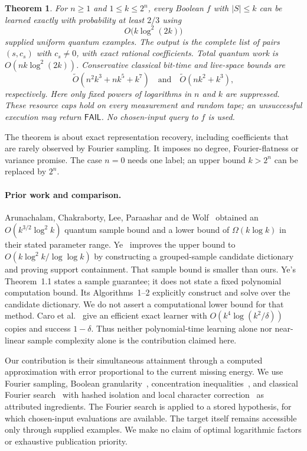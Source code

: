 \documentclass[11pt]{article}
\newtheorem{theorem}{Theorem}
\theoremstyle{remark}\newtheorem{remark}[theorem]{Remark}
\newcommand{\FAIL}{\mathsf{FAIL}}
\begin{document}
\begin{theorem}\label{thm:main}
For $n\ge1$ and $1\le k\le2^n$, every Boolean $f$ with $|S|\le k$ can be learned exactly with probability at least $2/3$ using
\[
 O\bigl(k\log^2(2k)\bigr)
\]
supplied uniform quantum examples. The output is the complete list of pairs $(s,c_s)$ with $c_s\ne0$, with exact rational coefficients. Total quantum work is $O(nk\log^2(2k))$. Conservative classical bit-time and live-space bounds are
\begin{equation}\label{eq:resources}
 \widetilde O(n^2k^3+nk^5+k^7)\quad\text{and}\quad
 \widetilde O(nk^2+k^3),
\end{equation}
respectively. Here only fixed powers of logarithms in $n$ and $k$ are suppressed. These resource caps hold on every measurement and random tape; an unsuccessful execution may return $\FAIL$. No chosen-input query to $f$ is used.
\end{theorem}

The theorem is about exact representation recovery, including coefficients that are rarely observed by Fourier sampling. It imposes no degree, Fourier-flatness or variance promise. The case $n=0$ needs one label; an upper bound $k>2^n$ can be replaced by $2^n$.

\paragraph{Prior work and comparison.}
Arunachalam, Chakraborty, Lee, Paraashar and de Wolf~\cite{ACLPW} obtained an $O(k^{3/2}\log^2 k)$ quantum sample bound and a lower bound of $\Omega(k\log k)$ in their stated parameter range. Ye~\cite[version~1]{Ye} improves the upper bound to $O(k\log^2 k/\log\log k)$ by constructing a grouped-sample candidate dictionary and proving support containment. That sample bound is smaller than ours. Ye's Theorem~1.1 states a sample guarantee; it does not state a fixed polynomial computation bound. Its Algorithms~1--2 explicitly construct and solve over the candidate dictionary. We do not assert a computational lower bound for that method. Caro et al.~\cite[Corollary~10]{Caro} give an efficient exact learner with $O(k^4\log(k^2/\delta))$ copies and success $1-\delta$. Thus neither polynomial-time learning alone nor near-linear sample complexity alone is the contribution claimed here.

Our contribution is their simultaneous attainment through a computed approximation with error proportional to the current missing energy. We use Fourier sampling, Boolean granularity~\cite{GOSSW}, concentration inequalities~\cite{Tropp}, and classical Fourier search~\cite{KM} with hashed isolation and local character correction~\cite{Datta} as attributed ingredients. The Fourier search is applied to a stored hypothesis, for which chosen-input evaluations are available. The target itself remains accessible only through supplied examples. We make no claim of optimal logarithmic factors or exhaustive publication priority.
\end{document}
